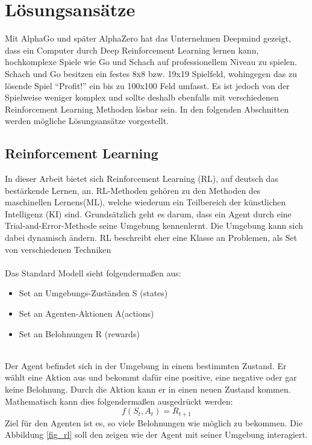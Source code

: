 \section{Lösungsansätze}\label{cap:loesungsansatze}
Mit AlphaGo und später AlphaZero hat das Unternehmen Deepmind gezeigt, dass ein Computer durch Deep Reinforcement Learning lernen kann, hochkomplexe Spiele wie Go und Schach auf professionellem Niveau zu spielen.  Schach und Go besitzen ein festes 8x8 bzw. 19x19 Spielfeld, wohingegen das zu lösende Spiel “Profit!” ein bis zu 100x100 Feld umfasst. Es ist jedoch von der Spielweise weniger komplex und sollte deshalb ebenfalls mit verschiedenen Reinforcement Learning Methoden lösbar sein. In den folgenden Abschnitten werden mögliche Lösungsansätze vorgestellt. 
\subsection{Reinforcement Learning}
In dieser Arbeit bietet sich Reinforcement Learning (RL), auf deutsch das bestärkende Lernen, an. RL-Methoden gehören zu den Methoden des maschinellen Lernens(ML), welche wiederum ein Teilbereich der künstlichen Intelligenz (KI) sind. Grundsätzlich geht es darum, dass ein Agent durch eine Trial-and-Error-Methode seine Umgebung kennenlernt. Die Umgebung kann sich dabei dynamisch ändern. RL beschreibt eher eine Klasse an Problemen, als Set von verschiedenen Techniken 
\\\\
Das Standard Modell sieht folgendermaßen aus:
\begin{itemize}
	\item Set an Umgebungs-Zuständen S (states)
	\item Set an Agenten-Aktionen A(actions)
	\item Set an Belohnungen R (rewards)
\end{itemize}
\\
Der Agent befindet sich in der Umgebung in einem bestimmten Zustand. Er wählt eine Aktion aus und bekommt dafür eine positive, eine negative oder gar keine Belohnung. Durch die Aktion kann er in einen neuen Zustand kommen. Mathematisch kann dies folgendermaßen ausgedrückt werden:
\begin{equation}
	f(S_t,A_t)= R_{t+1}
\end{equation}
Ziel für den Agenten ist es, so viele Belohnungen wie möglich zu bekommen. Die Abbildung \ref{fig_rl} soll den zeigen wie der Agent mit seiner Umgebung interagiert.
